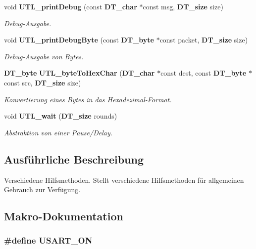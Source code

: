 \begin{DoxyCompactItemize}
void {\bf UTL\_\-printDebug} (const {\bf DT\_\-char} $\ast$const msg, {\bf DT\_\-size} size)
\begin{DoxyCompactList}\small\item\em Debug-\/Ausgabe. \item\end{DoxyCompactList}\item 
void {\bf UTL\_\-printDebugByte} (const {\bf DT\_\-byte} $\ast$const packet, {\bf DT\_\-size} size)
\begin{DoxyCompactList}\small\item\em Debug-\/Ausgabe von Bytes. \item\end{DoxyCompactList}\item 
{\bf DT\_\-byte} {\bf UTL\_\-byteToHexChar} ({\bf DT\_\-char} $\ast$const dest, const {\bf DT\_\-byte} $\ast$const src, {\bf DT\_\-size} size)
\begin{DoxyCompactList}\small\item\em Konvertierung eines Bytes in das Hexadezimal-\/Format. \item\end{DoxyCompactList}\item 
void {\bf UTL\_\-wait} ({\bf DT\_\-size} rounds)
\begin{DoxyCompactList}\small\item\em Abstraktion von einer Pause/Delay. \item\end{DoxyCompactList}\end{DoxyCompactItemize}


\subsection{Ausführliche Beschreibung}
Verschiedene Hilfsmethoden. Stellt verschiedene Hilfsmethoden für allgemeinen Gebrauch zur Verfügung. 

\subsection{Makro-\/Dokumentation}
\subsubsection[{USART\_\-ON}]{\setlength{\rightskip}{0pt plus 5cm}\#define USART\_\-ON}\label{utils_8c_a4f991907e1258478927acfccf15dccbb}


